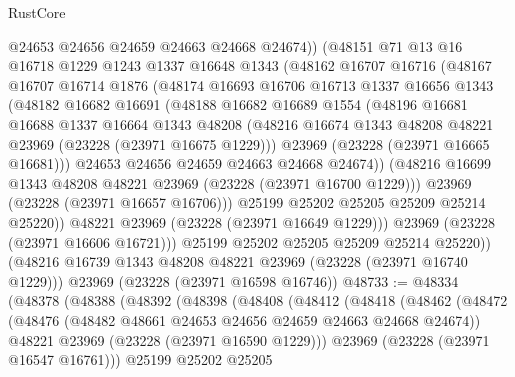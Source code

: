 \begin{lexlean}{RustCore}
\begin{coremodule}
              @24653
              @24656
              @24659
              @24663
              @24668
              @24674))
          (@48151
            @71
            @13
            @16
            @16718
            @1229
            @1243
            @1337
            @16648
            @1343
            (@48162
              @16707
              @16716
              (@48167
                @16707
                @16714
                @1876
                (@48174
                  @16693
                  @16706
                  @16713
                  @1337
                  @16656
                  @1343
                  (@48182
                    @16682
                    @16691
                    (@48188
                      @16682
                      @16689
                      @1554
                      (@48196
                        @16681
                        @16688
                        @1337
                        @16664
                        @1343
                        @48208
                        (@48216 @16674 @1343 @48208 @48221 @23969 (@23228 (@23971 @16675 @1229)))
                        @23969
                        (@23228 (@23971 @16665 @16681)))
                      @24653
                      @24656
                      @24659
                      @24663
                      @24668
                      @24674))
                  (@48216 @16699 @1343 @48208 @48221 @23969 (@23228 (@23971 @16700 @1229)))
                  @23969
                  (@23228 (@23971 @16657 @16706)))
                @25199
                @25202
                @25205
                @25209
                @25214
                @25220))
            @48221
            @23969
            (@23228 (@23971 @16649 @1229)))
          @23969
          (@23228 (@23971 @16606 @16721)))
        @25199
        @25202
        @25205
        @25209
        @25214
        @25220))
    (@48216 @16739 @1343 @48208 @48221 @23969 (@23228 (@23971 @16740 @1229)))
    @23969
    (@23228 (@23971 @16598 @16746))
@48733 := @48334
    (@48378
      (@48388
        (@48392
          (@48398
            (@48408
              (@48412
                (@48418
                  (@48462
                    (@48472
                      (@48476 (@48482 @48661 @24653 @24656 @24659 @24663 @24668 @24674))
                      @48221
                      @23969
                      (@23228 (@23971 @16590 @1229)))
                    @23969
                    (@23228 (@23971 @16547 @16761)))
                  @25199
                  @25202
                  @25205

\end{coremodule}
\end{lexlean}
